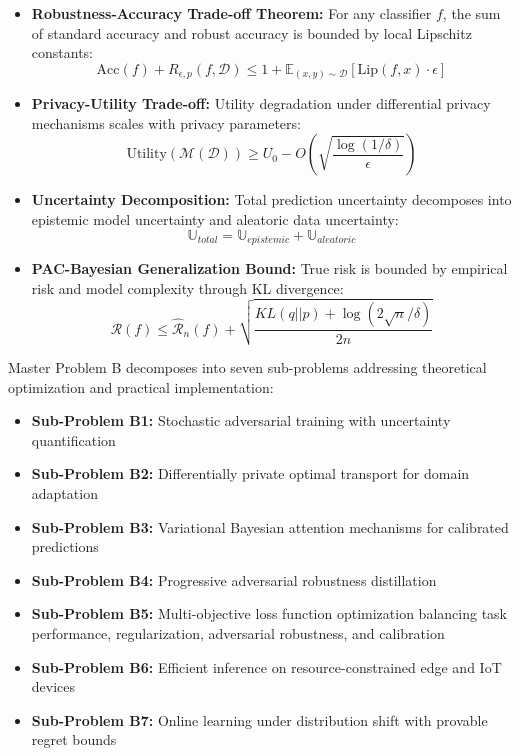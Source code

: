 \begin{itemize}[leftmargin=1.5em]
\item \textbf{Robustness-Accuracy Trade-off Theorem:} For any classifier $f$, the sum of standard accuracy and robust accuracy is bounded by local Lipschitz constants:
\begin{equation}
\text{Acc}(f) + R_{\epsilon,p}(f,\mathcal{D}) \leq 1 + \mathbb{E}_{(x,y) \sim \mathcal{D}}[\text{Lip}(f,x) \cdot \epsilon]
\end{equation}

\item \textbf{Privacy-Utility Trade-off:} Utility degradation under differential privacy mechanisms scales with privacy parameters:
\begin{equation}
\text{Utility}(\mathcal{M}(\mathcal{D})) \geq U_0 - O\left(\sqrt{\frac{\log(1/\delta)}{\epsilon}}\right)
\end{equation}

\item \textbf{Uncertainty Decomposition:} Total prediction uncertainty decomposes into epistemic model uncertainty and aleatoric data uncertainty:
\begin{equation}
\mathbb{U}_{total} = \mathbb{U}_{epistemic} + \mathbb{U}_{aleatoric}
\end{equation}

\item \textbf{PAC-Bayesian Generalization Bound:} True risk is bounded by empirical risk and model complexity through KL divergence:
\begin{equation}
\mathcal{R}(f) \leq \hat{\mathcal{R}}_n(f) + \sqrt{\frac{KL(q||p) + \log(2\sqrt{n}/\delta)}{2n}}
\end{equation}
\end{itemize}

Master Problem B decomposes into seven sub-problems addressing theoretical optimization and practical implementation:

\begin{itemize}[leftmargin=1.5em]
\item \textbf{Sub-Problem B1:} Stochastic adversarial training with uncertainty quantification
\item \textbf{Sub-Problem B2:} Differentially private optimal transport for domain adaptation
\item \textbf{Sub-Problem B3:} Variational Bayesian attention mechanisms for calibrated predictions
\item \textbf{Sub-Problem B4:} Progressive adversarial robustness distillation
\item \textbf{Sub-Problem B5:} Multi-objective loss function optimization balancing task performance, regularization, adversarial robustness, and calibration
\item \textbf{Sub-Problem B6:} Efficient inference on resource-constrained edge and IoT devices
\item \textbf{Sub-Problem B7:} Online learning under distribution shift with provable regret bounds
\end{itemize}

